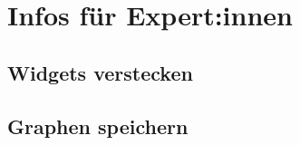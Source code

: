 \documentclass[12pt]{report}
\begin{document}
\section{Infos für Expert:innen}
\subsection{Widgets verstecken}
\subsection{Graphen speichern}
\end{document}
